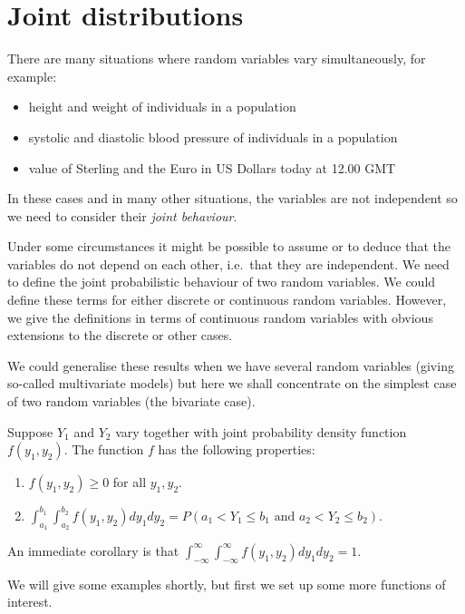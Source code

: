 \documentclass[]{book}
\providecommand{\tightlist}{%
  \setlength{\itemsep}{0pt}\setlength{\parskip}{0pt}}
\theoremstyle{definition}
\theoremstyle{definition}
\theoremstyle{definition}
\theoremstyle{remark}
\begin{document}
\section{Joint distributions}\label{joint-distributions}

There are many situations where random variables vary simultaneously,
for example:

\begin{itemize}
\tightlist
\item
  height and weight of individuals in a population
\item
  systolic and diastolic blood pressure of individuals in a population
\item
  value of Sterling and the Euro in US Dollars today at 12.00 GMT
\end{itemize}

In these cases and in many other situations, the variables are not
independent so we need to consider their \emph{joint behaviour}.

Under some circumstances it might be possible to assume or to deduce
that the variables do not depend on each other, i.e.~that they are
independent. We need to define the joint probabilistic behaviour of two
random variables. We could define these terms for either discrete or
continuous random variables. However, we give the definitions in terms
of continuous random variables with obvious extensions to the discrete
or other cases.

We could generalise these results when we have several random variables
(giving so-called multivariate models) but here we shall concentrate on
the simplest case of two random variables (the bivariate case).

Suppose \(Y_1\) and \(Y_2\) vary together with joint probability density
function \(f(y_1 , y_2)\). The function \(f\) has the following
properties:

\begin{enumerate}
\def\labelenumi{\arabic{enumi}.}
\tightlist
\item
  \(f(y_1, y_2) \geq 0\) for all \(y_1, y_2\).
\item
  \(\int_{a_1}^{b_1} \int_{a_2}^{b_2} f(y_1, y_2) dy_1 dy_2 = P(a_1 < Y_1 \leq b_1 \text{ and } a_2 < Y_2 \leq b_2)\).
\end{enumerate}

An immediate corollary is that
\(\int_{-\infty}^{\infty} \int_{-\infty}^{\infty} f(y_1, y_2) dy_1 dy_2 = 1\).

We will give some examples shortly, but first we set up some more
functions of interest.
\end{document}
